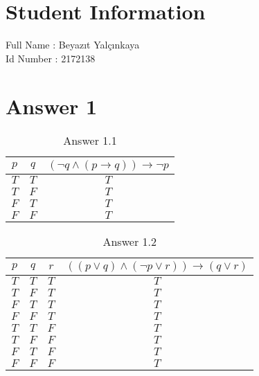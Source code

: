 \documentclass[12pt]{article}
\begin{document}
\section*{Student Information } 
Full Name :  Beyazıt Yalçınkaya\\
Id Number :  2172138\\

\section*{Answer 1}
\vspace{10px}

\begin{table}[H]
\centering
\caption{Answer 1.1}
\label{my-label1}
\begin{tabular}{|c|c|c|}
\hline
$p$&$q$&$(\neg q \land(p \rightarrow q)) \rightarrow \neg p$\\ \hline
$T$&$T$&$T$\\ \hline
$T$&$F$&$T$\\ \hline
$F$&$T$&$T$\\ \hline
$F$&$F$&$T$\\ \hline
\end{tabular}
\end{table}  

\vspace{10px}

\begin{table}[H]
\centering
\caption{Answer 1.2}
\label{my-label2}
\begin{tabular}{|c|c|c|c|}
\hline
$p$&$q$&$r$&$((p \lor q) \land (\neg p \lor r)) \rightarrow (q \lor r)$\\ \hline
$T$&$T$&$T$&$T$\\ \hline
$T$&$F$&$T$&$T$\\ \hline
$F$&$T$&$T$&$T$\\ \hline
$F$&$F$&$T$&$T$\\ \hline
$T$&$T$&$F$&$T$\\ \hline
$T$&$F$&$F$&$T$\\ \hline
$F$&$T$&$F$&$T$\\ \hline
$F$&$F$&$F$&$T$\\ \hline
\end{tabular}
\end{table} 
\end{document}
